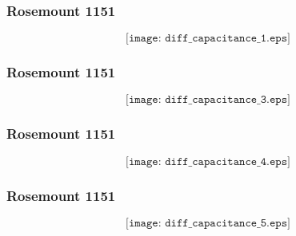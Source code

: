 \documentclass[aspectratio=169,xcolor=dvipsnames]{beamer}
\begin{document}
%
%
%
%
%
\begin{frame}
	\frametitle{Rosemount 1151}

	$$\texttt{[image: diff\_capacitance\_1.eps]}$$
\end{frame}
\begin{frame}
	\frametitle{Rosemount 1151}

	$$\texttt{[image: diff\_capacitance\_3.eps]}$$
\end{frame}
\begin{frame}
	\frametitle{Rosemount 1151}

	$$\texttt{[image: diff\_capacitance\_4.eps]}$$
\end{frame}
\begin{frame}
	\frametitle{Rosemount 1151}

	$$\texttt{[image: diff\_capacitance\_5.eps]}$$
\end{frame}
%
%
%
\end{document}
